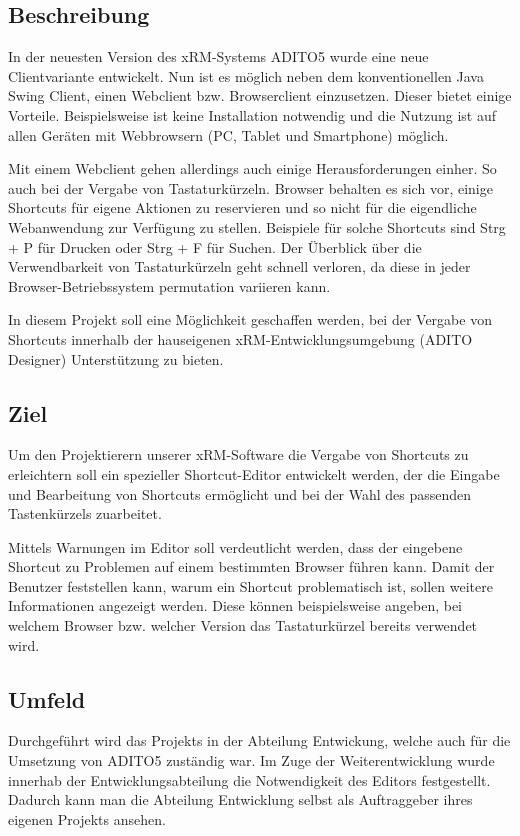 \subsection{Beschreibung}
 
In der neuesten Version des xRM-Systems ADITO5 wurde eine neue Clientvariante entwickelt. Nun ist es möglich neben dem konventionellen Java Swing Client, einen Webclient bzw. Browserclient einzusetzen. Dieser bietet einige Vorteile. Beispielsweise ist keine Installation notwendig und die Nutzung ist auf allen Geräten mit Webbrowsern (PC, Tablet und Smartphone) möglich. 

Mit einem Webclient gehen allerdings auch einige Herausforderungen einher. So auch bei der Vergabe von Tastaturkürzeln. Browser behalten es sich vor, einige Shortcuts für eigene Aktionen zu reservieren und so nicht für die eigendliche Webanwendung zur Verfügung zu stellen. Beispiele für solche Shortcuts sind Strg + P für Drucken oder Strg + F für Suchen. Der Überblick über die Verwendbarkeit von Tastaturkürzeln geht schnell verloren, da diese in jeder Browser-Betriebssystem permutation variieren kann.

In diesem Projekt soll eine Möglichkeit geschaffen werden, bei der Vergabe von Shortcuts innerhalb der hauseigenen xRM-Entwicklungsumgebung (ADITO Designer) Unterstützung zu bieten.

\subsection{Ziel}

Um den Projektierern unserer xRM-Software die Vergabe von Shortcuts zu erleichtern soll ein spezieller Shortcut-Editor entwickelt werden, der die Eingabe und Bearbeitung von Shortcuts ermöglicht und bei der Wahl des passenden Tastenkürzels zuarbeitet.

Mittels Warnungen im Editor soll verdeutlicht werden, dass der eingebene Shortcut zu Problemen auf einem bestimmten Browser führen kann.
Damit der Benutzer feststellen kann, warum ein Shortcut problematisch ist, sollen weitere Informationen angezeigt werden. Diese können beispielsweise angeben, bei welchem Browser bzw. welcher Version das Tastaturkürzel bereits verwendet wird.

\subsection{Umfeld}

Durchgeführt wird das Projekts in der Abteilung Entwickung, welche auch für die Umsetzung von ADITO5 zuständig war. Im Zuge der Weiterentwicklung wurde innerhab der Entwicklungsabteilung die Notwendigkeit des Editors festgestellt. Dadurch kann man die Abteilung Entwicklung selbst als Auftraggeber ihres eigenen Projekts ansehen.

